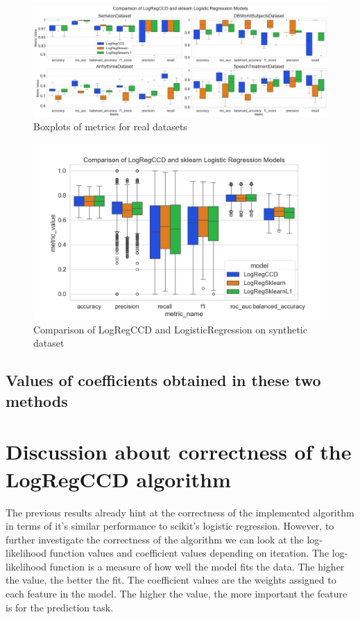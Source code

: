 \documentclass[12pt]{article}
\begin{document}
\begin{figure}[h]
    \centering
  \includegraphics[width=\textwidth]{../results/real_data_boxplots.png}
    \caption{Boxplots of metrics for real datasets}
    \label{fig:real-data-boxplots}
  \end{figure}

\begin{figure}[h]
    \centering
  \includegraphics[width=\textwidth]{../results/comparison-synthetic-dataset.png}
    \caption{Comparison of LogRegCCD and LogisticRegression on synthetic dataset}
    \label{fig:comparison-synthetic-dataset}
  \end{figure}

\subsection{Values of coefficients obtained in these two methods}


\section{Discussion about correctness of the LogRegCCD algorithm}

The previous results already hint at the correctness of the implemented algorithm in terms of it's similar performance to scikit's logistic regression. However, to further investigate the correctness of the algorithm we can look at the log-likelihood function values and coefficient values depending on iteration. The log-likelihood function is a measure of how well the model fits the data. The higher the value, the better the fit. The coefficient values are the weights assigned to each feature in the model. The higher the value, the more important the feature is for the prediction task. \par
\end{document}
